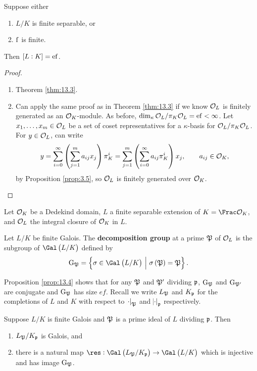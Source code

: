 \begin{corollary}
\label{cor:13.6}
Suppose either
\begin{enumerate}
\item $ L / K $ is finite separable, or
\item $ \mathrm{f} $ is finite.
\end{enumerate}
Then $ \sbr{L : K} = \e\f $.
\end{corollary}

\begin{proof}
\hfill
\begin{enumerate}
\item Theorem \ref{thm:13.3}.
\item Can apply the same proof as in Theorem \ref{thm:13.3} if we know $ \mathcal{O}_L $ is finitely generated as an $ \mathcal{O}_K $-module. As before, $ \dim_\kappa \mathcal{O}_L / \pi_K\mathcal{O}_L = \mathrm{e}\mathrm{f} < \infty $. Let $ x_1, \dots, x_m \in \mathcal{O}_L $ be a set of coset representatives for a $ \kappa $-basis for $ \mathcal{O}_L / \pi_K\mathcal{O}_L $. For $ y \in \mathcal{O}_L $, can write
$$ y = \sum_{i = 0}^\infty \br{\sum_{j = 1}^m a_{ij}x_j}\pi_K^i = \sum_{j = 1}^m \br{\sum_{i = 0}^\infty a_{ij}\pi_K^i}x_j, \qquad a_{ij} \in \OOO_K, $$
by Proposition \ref{prop:3.5}, so $ \mathcal{O}_L $ is finitely generated over $ \mathcal{O}_K $.
\end{enumerate}
\end{proof}

Let $ \mathcal{O}_K $ be a Dedekind domain, $ L $ a finite separable extension of $ K = \Frac \OOO_K $, and $ \mathcal{O}_L $ the integral closure of $ \mathcal{O}_K $ in $ L $.

\begin{definition}
Let $ L / K $ be finite Galois. The \textbf{decomposition group} at a prime $ \mathfrak{P} $ of $ \mathcal{O}_L $ is the subgroup of $ \Gal\br{L / K} $ defined by
$$ \G_\pp = \cbr{\sigma \in \Gal\br{L / K} \st \sigma\br{\pp} = \pp}. $$
\end{definition}

Proposition \ref{prop:13.4} shows that for any $ \mathfrak{P} $ and $ \mathfrak{P}' $ dividing $ \mathfrak{p} $, $ \mathrm{G}_{\mathfrak{P}} $ and $ \mathrm{G}_{\mathfrak{P}'} $ are conjugate and $ \mathrm{G}_{\mathfrak{P}} $ has size $ ef $. Recall we write $ L_{\mathfrak{P}} $ and $ K_{\mathfrak{p}} $ for the completions of $ L $ and $ K $ with respect to $ \abs{\cdot}_{\mathfrak{P}} $ and $ \abs{\cdot}_{\mathfrak{p}} $ respectively.

\begin{proposition}
Suppose $ L / K $ is finite Galois and $ \mathfrak{P} $ is a prime ideal of $ L $ dividing $ \mathfrak{p} $. Then
\begin{enumerate}
\item $ L_{\mathfrak{P}} / K_{\mathfrak{p}} $ is Galois, and
\item there is a natural map $ \res : \Gal\br{L_\pp / K_\ppp} \to \Gal\br{L / K} $ which is injective and has image $ \mathrm{G}_{\mathfrak{P}} $.
\end{enumerate}
\end{proposition}

